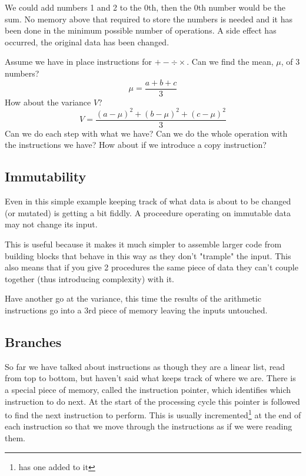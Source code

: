 \documentclass{article}
\begin{document}
We could add numbers 1 and 2 to the 0th, then the 0th number would be the sum.
No memory above that required to store the numbers is needed and it has been
done in the minimum possible number of operations. A side effect has occurred,
the original data has been changed.

Assume we have in place instructions for $+-\div\times$.
Can we find the mean, $\mu$, of 3 numbers?
\begin{displaymath}
\mu = \frac{a + b + c}{3}
\end{displaymath}
How about the variance $V$?
\begin{displaymath}
V = \frac{(a - \mu)^2 + (b - \mu)^2 + (c - \mu)^2}{3}
\end{displaymath}
Can we do each step with what we have?
Can we do the whole operation with the instructions we have?
How about if we introduce a copy instruction?

\subsection{Immutability}
Even in this simple example keeping track of what data is about to be changed
(or mutated) is getting a bit fiddly.
A proceedure operating on immutable data may not change its input.

This is useful because it makes it much simpler to assemble larger code from
building blocks that behave in this way as they don't "trample" the input.
This also means that if you give 2 procedures the same piece of data they can't
couple together (thus introducing complexity) with it.

Have another go at the variance, this time the results of the arithmetic
instructions go into a 3rd piece of memory leaving the inputs untouched.

\subsection{Branches}
So far we have talked about instructions as though they are a linear list, read
from top to bottom, but haven't said what keeps track of where we are.
There is a special piece of memory, called the instruction pointer, which
identifies which instruction to do next.
At the start of the processing cycle this pointer is followed to find the next
instruction to perform.
This is usually incremented\footnote{has one added to it} at the end of each
instruction so that we move through the instructions as if we were reading
them.
\end{document}
